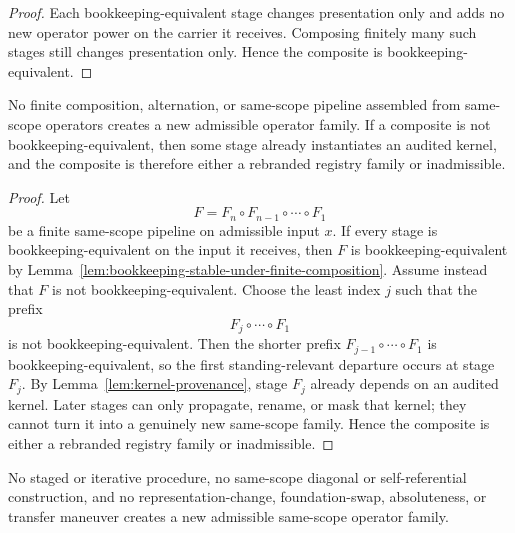 \begin{proof}
Each bookkeeping-equivalent stage changes presentation only and adds no new operator power on the carrier it receives. Composing finitely many such stages still changes presentation only. Hence the composite is bookkeeping-equivalent.
\end{proof}

\begin{theorem}
\label{thm:composition-alternation-closure}
No finite composition, alternation, or same-scope pipeline assembled from same-scope operators creates a new admissible operator family. If a composite is not bookkeeping-equivalent, then some stage already instantiates an audited kernel, and the composite is therefore either a rebranded registry family or inadmissible.
\end{theorem}

\begin{proof}
Let
\[
F=F_n\circ F_{n-1}\circ\cdots\circ F_1
\]
be a finite same-scope pipeline on admissible input $x$. If every stage is bookkeeping-equivalent on the input it receives, then $F$ is bookkeeping-equivalent by Lemma~\ref{lem:bookkeeping-stable-under-finite-composition}. Assume instead that $F$ is not bookkeeping-equivalent. Choose the least index $j$ such that the prefix
\[
F_j\circ\cdots\circ F_1
\]
is not bookkeeping-equivalent. Then the shorter prefix $F_{j-1}\circ\cdots\circ F_1$ is bookkeeping-equivalent, so the first standing-relevant departure occurs at stage $F_j$. By Lemma~\ref{lem:kernel-provenance}, stage $F_j$ already depends on an audited kernel. Later stages can only propagate, rename, or mask that kernel; they cannot turn it into a genuinely new same-scope family. Hence the composite is either a rebranded registry family or inadmissible.
\end{proof}

\begin{theorem}
\label{thm:iteration-selfref-transfer-closure}
No staged or iterative procedure, no same-scope diagonal or self-referential construction, and no representation-change, foundation-swap, absoluteness, or transfer maneuver creates a new admissible same-scope operator family.
\end{theorem}

